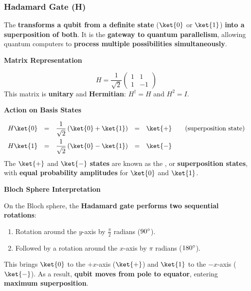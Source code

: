\subsubsection{Hadamard Gate (H)}\label{subsubsection: Hadamard Gate H}

The  \textbf{transforms a qubit from a definite state} ($\ket{0}$ or $\ket{1}$) \textbf{into a superposition of both}. It is the \textbf{gateway to quantum parallelism}, allowing quantum computers to \textbf{process multiple possibilities simultaneously}.

\highspace
\begin{flushleft}
    \textcolor{Green3}{ \textbf{Matrix Representation}}
\end{flushleft}
\begin{equation}
    H = \dfrac{1}{\sqrt{2}} 
    \begin{pmatrix}
        1 & 1 \\ 1 & -1
    \end{pmatrix}
\end{equation}
This matrix is \textbf{unitary} and \textbf{Hermitian}: $H^{\dagger} = H$ and $H^{2} = I$.

\highspace
\begin{flushleft}
    \textcolor{Green3}{ \textbf{Action on Basis States}}
\end{flushleft}
\begin{equation*}
    \begin{array}{rclcl}
        H \ket{0} &=& \dfrac{1}{\sqrt{2}}\left(\ket{0} + \ket{1}\right) &=& \ket{+} \hspace{2em} \text{(superposition state)} \\ [1em]
        H \ket{1} &=& \dfrac{1}{\sqrt{2}}\left(\ket{0} - \ket{1}\right) &=& \ket{-}
    \end{array}
\end{equation*}
The $\ket{+}$ and $\ket{-}$ \textbf{states} are known as the , or \textbf{superposition states}, with \textbf{equal probability amplitudes} for $\ket{0}$ and $\ket{1}$.

\highspace
\begin{flushleft}
    \textcolor{Green3}{ \textbf{Bloch Sphere Interpretation}}
\end{flushleft}
On the Bloch sphere, the \textbf{Hadamard gate performs two sequential rotations}:
\begin{enumerate}
    \item Rotation around the $y$-axis by $\frac{\pi}{2}$ radians ($90\degree$).
    \item Followed by a rotation around the $x$-axis by $\pi$ radians ($180\degree$).
\end{enumerate}
This brings $\ket{0}$ to the $+x$-axis ($\ket{+}$) and $\ket{1}$ to the $-x$-axis ($\ket{-}$). As a result, \textbf{qubit moves from pole to equator}, entering \textbf{maximum superposition}.

